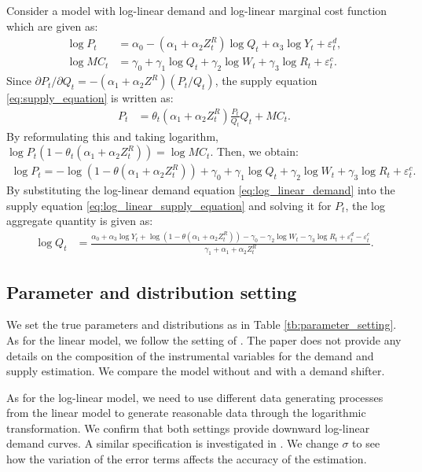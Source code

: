\documentclass[11pt, a4paper]{article}
\begin{document}
Consider a model with log-linear demand and log-linear marginal cost function which are given as:
\begin{align}
    \log P_{t} &= \alpha_0 - (\alpha_1 + \alpha_2 Z^{R}_{t}) \log Q_t + \alpha_3 \log Y_t + \varepsilon^{d}_{t},\label{eq:log_linear_demand}\\
    \log MC_t &= \gamma_0 + \gamma_1 \log Q_t +  \gamma_2 \log W_{t} + \gamma_3 \log R_t + \varepsilon^{c}_{t}.\label{eq:log_linear_marginal_cost}
\end{align}
Since $\partial P_t/\partial Q_t = - (\alpha_1 + \alpha_2 Z^R) (P_t/Q_t) $, the supply equation \eqref{eq:supply_equation} is written as:
\begin{align*}
    P_t &= \theta_t (\alpha_1 + \alpha_2 Z^{R}_{t}) \frac{P_t}{Q_t} Q_t + MC_t.
\end{align*}
By reformulating this and taking logarithm, $\log P_t(1 -\theta_t (\alpha_1 + \alpha_2 Z^{R}_{t})) = \log MC_t.$ Then, we obtain:
\begin{align}
    \log P_t = - \log(1 - \theta(\alpha_1 + \alpha_2 Z^{R}_{t})) + \gamma_0 + \gamma_1 \log Q_t +  \gamma_2 \log W_{t} + \gamma_3 \log R_t + \varepsilon^{c}_{t}. \label{eq:log_linear_supply_equation}
\end{align}
By substituting the log-linear demand equation \eqref{eq:log_linear_demand} into the supply equation \eqref{eq:log_linear_supply_equation} and solving it for $P_{t}$, the log aggregate quantity is given as: 
\begin{align*}
    \log Q_t &= \frac{ \alpha_0 + \alpha_3 \log Y_t + \log (1 - \theta (\alpha_1 + \alpha_2 Z^{R}_{t})) - \gamma_0  -  \gamma_2 \log W_{t} - \gamma_3 \log R_t + \varepsilon^{d}_{t} - \varepsilon^{c}_{t}}{\gamma_1+ \alpha_1 + \alpha_2 Z^{R}_{t} }.
\end{align*}



\subsection{Parameter and distribution setting}

We set the true parameters and distributions as in Table \ref{tb:parameter_setting}. 
As for the linear model, we follow the setting of \cite{perloff2012collinearity}.
The paper does not provide any details on the composition of the instrumental variables for the demand and supply estimation. We compare the model without and with a demand shifter.

As for the log-linear model, we need to use different data generating processes from the linear model to generate reasonable data through the logarithmic transformation. 
We confirm that both settings provide downward log-linear demand curves.
A similar specification is investigated in \cite{hyde1995can}.
We change $\sigma$ to see how the variation of the error terms affects the accuracy of the estimation.
\end{document}
